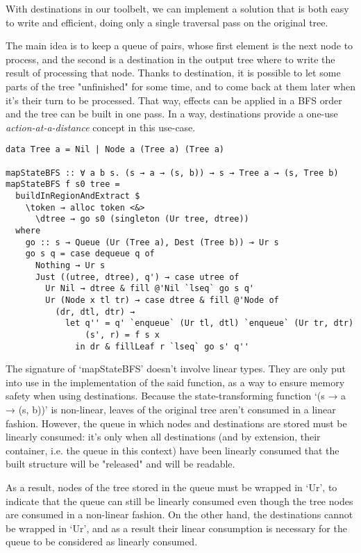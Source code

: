 \documentclass[english]{jflart}
\begin{document}
With destinations in our toolbelt, we can implement a solution that is both easy to write and efficient, doing only a single traversal pass on the original tree.

The main idea is to keep a queue of pairs, whose first element is the next node to process, and the second is a destination in the output tree where to write the result of processing that node. Thanks to destination, it is possible to let some parts of the tree "unfinished" for some time, and to come back at them later when it's their turn to be processed. That way, effects can be applied in a BFS order and the tree can be built in one pass. In a way, destinations provide a one-use \emph{action-at-a-distance} concept in this use-case.

\begin{verbatim}
data Tree a = Nil | Node a (Tree a) (Tree a)

mapStateBFS :: ∀ a b s. (s → a → (s, b)) → s → Tree a → (s, Tree b)
mapStateBFS f s0 tree =
  buildInRegionAndExtract $
    \token → alloc token <&>
      \dtree → go s0 (singleton (Ur tree, dtree))
  where
    go :: s → Queue (Ur (Tree a), Dest (Tree b)) ⊸ Ur s
    go s q = case dequeue q of
      Nothing → Ur s
      Just ((utree, dtree), q') → case utree of
        Ur Nil → dtree & fill @'Nil `lseq` go s q'
        Ur (Node x tl tr) → case dtree & fill @'Node of
          (dr, dtl, dtr) →
            let q'' = q' `enqueue` (Ur tl, dtl) `enqueue` (Ur tr, dtr)
                (s', r) = f s x
              in dr & fillLeaf r `lseq` go s' q''
\end{verbatim}

The signature of `mapStateBFS' doesn't involve linear types. They are only put into use in the implementation of the said function, as a way to ensure memory safety when using destinations.
Because the state-transforming function `(s → a → (s, b))' is non-linear, leaves of the original tree aren't consumed in a linear fashion. However, the queue in which nodes and destinations are stored must be linearly consumed: it's only when all destinations (and by extension, their container, i.e. the queue in this context) have been linearly consumed that the built structure will be "released" and will be readable.

As a result, nodes of the tree stored in the queue must be wrapped in `Ur', to indicate that the queue can still be linearly consumed even though the tree nodes are consumed in a non-linear fashion. On the other hand, the destinations cannot be wrapped in `Ur', and as a result their linear consumption is necessary for the queue to be considered as linearly consumed.
\end{document}
